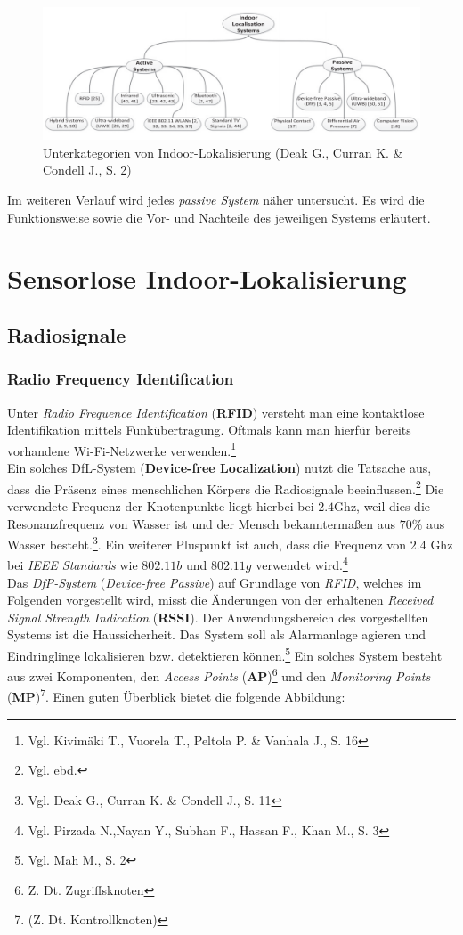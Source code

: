 \begin{figure}[H]
	\centering
	\includegraphics[scale=0.9]{pictures/indoor_loc}
	\caption{Unterkategorien von Indoor-Lokalisierung (Deak G.,  Curran K. \& Condell J., S. 2)}
\end{figure}

Im weiteren Verlauf wird jedes \textit{passive System} näher untersucht. Es wird die Funktionsweise sowie die Vor- und Nachteile des jeweiligen Systems erläutert.


\section{Sensorlose Indoor-Lokalisierung}
\subsection{Radiosignale}
\subsubsection{Radio Frequency Identification}
Unter \textit{Radio Frequence Identification} (\textbf{RFID}) versteht man eine kontaktlose Identifikation mittels Funkübertragung. Oftmals kann man hierfür bereits vorhandene Wi-Fi-Netzwerke verwenden.\footnote{Vgl. Kivimäki T., Vuorela T., Peltola P. \& Vanhala J., S.  16} \\
Ein solches DfL-System (\textbf{Device-free Localization}) nutzt die Tatsache aus, dass die Präsenz eines menschlichen Körpers die Radiosignale beeinflussen.\footnote{Vgl. ebd.} Die verwendete Frequenz der Knotenpunkte liegt hierbei bei $2.4$Ghz, weil dies die Resonanzfrequenz von Wasser ist und der Mensch bekanntermaßen aus $70\%$ aus Wasser besteht.\footnote{Vgl. Deak G.,  Curran K. \& Condell J., S. 11}. Ein weiterer Pluspunkt ist auch, dass die Frequenz von $2.4$ Ghz bei \textit{IEEE Standards} wie $802.11b$ und $802.11g$ verwendet wird.\footnote{Vgl. Pirzada N.,Nayan Y., Subhan F., Hassan F., Khan M., S. 3}\\
Das \textit{DfP-System} (\textit{Device-free Passive}) auf Grundlage von \textit{RFID}, welches im Folgenden vorgestellt wird, misst die Änderungen von der erhaltenen \textit{Received Signal Strength Indication} (\textbf{RSSI}). Der Anwendungsbereich des vorgestellten Systems ist die Haussicherheit. Das System soll als Alarmanlage agieren und Eindringlinge lokalisieren bzw. detektieren können.\footnote{Vgl. Mah M., S. 2} Ein solches System besteht aus zwei Komponenten, den \textit{Access Points} (\textbf{AP})\footnote{Z. Dt. Zugriffsknoten} und den \textit{Monitoring Points} (\textbf{MP})\footnote{(Z. Dt. Kontrollknoten)}. Einen guten Überblick bietet die folgende Abbildung:\\

